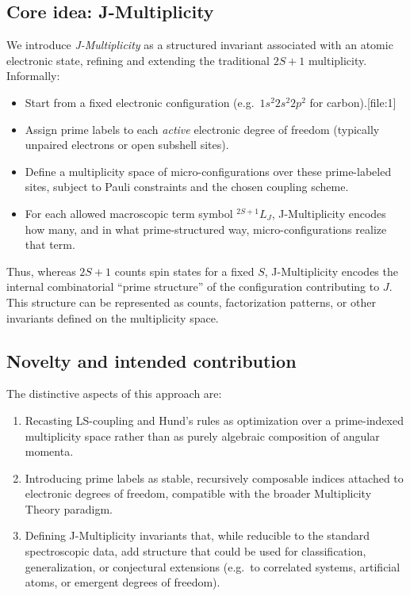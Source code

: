 \documentclass[11pt]{article}
\begin{document}
\subsection{Core idea: J-Multiplicity}

We introduce \emph{J-Multiplicity} as a structured invariant associated with an atomic electronic state, refining and extending the traditional \(2S+1\) multiplicity. Informally:
\begin{itemize}
  \item Start from a fixed electronic configuration (e.g.\ \(1s^2 2s^2 2p^2\) for carbon).[file:1]
  \item Assign prime labels to each \emph{active} electronic degree of freedom (typically unpaired electrons or open subshell sites).
  \item Define a multiplicity space of micro-configurations over these prime-labeled sites, subject to Pauli constraints and the chosen coupling scheme.
  \item For each allowed macroscopic term symbol \(^{2S+1}L_J\), J-Multiplicity encodes how many, and in what prime-structured way, micro-configurations realize that term.
\end{itemize}

Thus, whereas \(2S+1\) counts spin states for a fixed \(S\), J-Multiplicity encodes the internal combinatorial ``prime structure'' of the configuration contributing to \(J\). This structure can be represented as counts, factorization patterns, or other invariants defined on the multiplicity space.

\subsection{Novelty and intended contribution}

The distinctive aspects of this approach are:
\begin{enumerate}
  \item Recasting LS-coupling and Hund's rules as optimization over a prime-indexed multiplicity space rather than as purely algebraic composition of angular momenta.
  \item Introducing prime labels as stable, recursively composable indices attached to electronic degrees of freedom, compatible with the broader Multiplicity Theory paradigm.
  \item Defining J-Multiplicity invariants that, while reducible to the standard spectroscopic data, add structure that could be used for classification, generalization, or conjectural extensions (e.g.\ to correlated systems, artificial atoms, or emergent degrees of freedom).
\end{enumerate}
\end{document}
